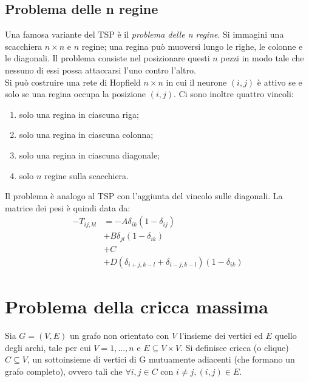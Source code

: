 \subsection{Problema delle n regine} %
\label{sub:problema_delle_n_regine}
Una famosa variante del TSP è il \emph{problema delle n regine}. Si immagini una scacchiera $n \times n$ e $n$ regine; una regina può muoversi lungo le righe, le colonne e le diagonali. Il problema consiste nel posizionare questi $n$ pezzi in modo tale che nessuno di essi possa attaccarsi l'uno contro l'altro.\\

Si può costruire una rete di Hopfield $n \times n$ in cui il neurone $(i,j)$ è attivo se e solo se una regina occupa la posizione $(i,j)$. Ci sono inoltre quattro vincoli:
\begin{enumerate}
	\item solo una regina in ciascuna riga;
	\item solo una regina in ciascuna colonna;
	\item solo una regina in ciascuna diagonale;
	\item solo $n$ regine sulla scacchiera.
\end{enumerate}

\newpage

Il problema è analogo al TSP con l'aggiunta del vincolo sulle diagonali. La matrice dei pesi è quindi data da:
\begin{align*}
	- T_{ij,kl} &= - A \delta_{ik} (1 - \delta_{ij}) \tag{peso inibitorio in ogni riga}\\
	& + B \delta_{jl} (1 - \delta_{ik}) \tag{peso inibitorio in ogni colonna} \\
	& + C  \qquad \tag{Inibizione globale}\\
	& + D (\delta_{i+j,k-l} + \delta_{i-j, k-l})(1 - \delta_{ik}) \tag{peso inibitorio sulle diagonale}
\end{align*}

\newpage

\section{Problema della cricca massima} %
\label{sec:problema_della_cricca_massima}

Sia $G=(V,E)$ un grafo non orientato con $V$ l'insieme dei vertici ed $E$ quello degli archi, tale per cui $V={1,\dots,n}$ e $E \subseteq V \times V$. Si definisce cricca (o clique) $C \subseteq V$, un sottoinsieme di vertici di G mutuamente adiacenti (che formano un grafo completo), ovvero tali che $\forall i,j \in C$ con $i \neq j, (i,j) \in E$.

